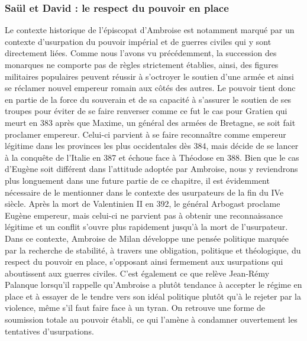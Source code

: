 \bigskip

\subsubsection{Saül et David : le respect du pouvoir en place}

Le contexte historique de l'épiscopat d'Ambroise est notamment marqué par un contexte d'usurpation du pouvoir impérial et de guerres civiles qui y sont directement liées. Comme nous l'avons vu précédemment, la succession des monarques ne comporte pas de règles strictement établies, ainsi, des figures militaires populaires peuvent réussir à s'octroyer le soutien d'une armée et ainsi se réclamer nouvel empereur romain aux côtés des autres. Le pouvoir tient donc en partie de la force du souverain et de sa capacité à s'assurer le soutien de ses troupes pour éviter de se faire renverser comme ce fut le cas pour Gratien qui meurt en 383 après que Maxime, un général des armées de Bretagne, se soit fait proclamer empereur. Celui-ci parvient à se faire reconnaître comme empereur légitime dans les provinces les plus occidentales dès 384, mais décide de se lancer à la conquête de l'Italie en 387 et échoue face à Théodose en 388. Bien que le cas d'Eugène soit différent dans l'attitude adoptée par Ambroise, nous y reviendrons plus longuement dans une future partie de ce chapitre, il est évidemment nécessaire de le mentionner dans le contexte des usurpateurs de la fin du IVe siècle. Après la mort de Valentinien II en 392, le général Arbogast proclame Eugène empereur, mais celui-ci ne parvient pas à obtenir une reconnaissance légitime et un conflit s'ouvre plus rapidement jusqu'à la mort de l'usurpateur. Dans ce contexte, Ambroise de Milan développe une pensée politique marquée par la recherche de stabilité, à travers une obligation, politique et théologique, du respect du pouvoir en place, s’opposant ainsi fermement aux usurpations qui aboutissent aux guerres civiles. C'est également ce que relève Jean-Rémy Palanque lorsqu'il rappelle qu'Ambroise a plutôt tendance à accepter le régime en place et à essayer de le tendre vers son idéal politique plutôt qu'à le rejeter par la violence, même s'il faut faire face à un tyran. On retrouve une forme de soumission totale au pouvoir établi, ce qui l'amène à condamner ouvertement les tentatives d'usurpations\autocite[349]{palanque_ambroise}.

\bigskip

